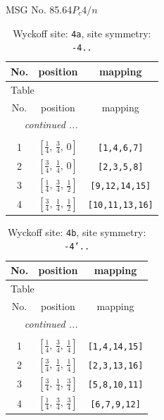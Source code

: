 \documentclass[fleqn,8pt]{jsarticle}
\begin{document}
\setcounter{MaxMatrixCols}{32}

\renewcommand{\tablename}{Table~}
\renewcommand{\figurename}{Figure~}
\begin{center}
\LARGE
MSG No. 85.64\quad$P_{c}4/n$
\end{center}
\renewcommand{\arraystretch}{1.2}
\begin{longtable}{ccc}
\caption{Wyckoff site: {\tt 4a}, site symmetry: {\tt -4..}}
 \\
 \hline \hline
No. & position & mapping \\ \hline \endfirsthead

\multicolumn{2}{l}{\tablename\ \thetable{}} \\
 \hline \hline
No. & position & mapping \\ \hline \endhead

 \hline \hline
\multicolumn{2}{r}{\footnotesize\it continued ...} \\ \endfoot

 \hline \hline
\multicolumn{2}{r}{} \\ \endlastfoot

1 & $\left[ \frac{1}{4},\, \frac{3}{4},\, 0 \right]$ & {\tt [1,4,6,7]} \\ \hline
2 & $\left[ \frac{3}{4},\, \frac{1}{4},\, 0 \right]$ & {\tt [2,3,5,8]} \\ \hline
3 & $\left[ \frac{1}{4},\, \frac{3}{4},\, \frac{1}{2} \right]$ & {\tt [9,12,14,15]} \\ \hline
4 & $\left[ \frac{3}{4},\, \frac{1}{4},\, \frac{1}{2} \right]$ & {\tt [10,11,13,16]} \\
\end{longtable}
\renewcommand{\arraystretch}{1.2}
\begin{longtable}{ccc}
\caption{Wyckoff site: {\tt 4b}, site symmetry: {\tt -4'..}}
 \\
 \hline \hline
No. & position & mapping \\ \hline \endfirsthead

\multicolumn{2}{l}{\tablename\ \thetable{}} \\
 \hline \hline
No. & position & mapping \\ \hline \endhead

 \hline \hline
\multicolumn{2}{r}{\footnotesize\it continued ...} \\ \endfoot

 \hline \hline
\multicolumn{2}{r}{} \\ \endlastfoot

1 & $\left[ \frac{1}{4},\, \frac{3}{4},\, \frac{1}{4} \right]$ & {\tt [1,4,14,15]} \\ \hline
2 & $\left[ \frac{3}{4},\, \frac{1}{4},\, \frac{1}{4} \right]$ & {\tt [2,3,13,16]} \\ \hline
3 & $\left[ \frac{3}{4},\, \frac{1}{4},\, \frac{3}{4} \right]$ & {\tt [5,8,10,11]} \\ \hline
4 & $\left[ \frac{1}{4},\, \frac{3}{4},\, \frac{3}{4} \right]$ & {\tt [6,7,9,12]} \\
\end{longtable}
\end{document}
